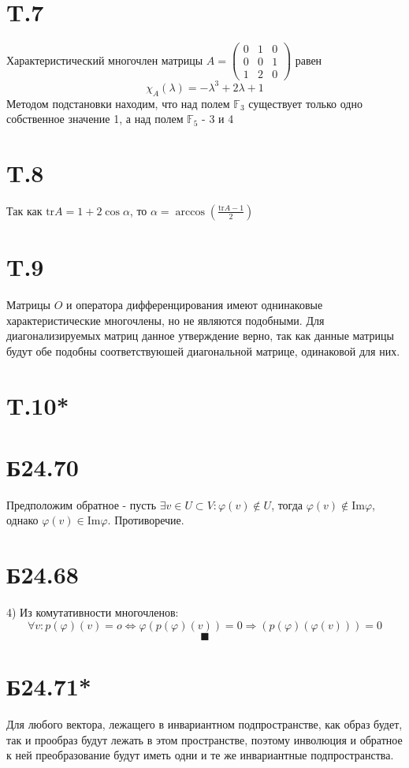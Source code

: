 \documentclass[a4paper,12pt]{article} %
\begin{document}
\section*{T.7}Характеристический многочлен матрицы $A=\begin{pmatrix*}
    0&1&0\\
    0&0&1\\
    1&2&0
\end{pmatrix*}$ равен
$$\chi_{A}(\lambda)=-\lambda^3+2\lambda+1$$
Методом подстановки находим, что над полем $\mathbb{F}_{3}$ существует только одно собственное значение 1, а над полем $\mathbb{F}_{5}$ - 3 и 4
\section*{T.8} Так как $\mathrm{tr}A=1+2\cos\alpha$, то $\alpha=\arccos\left(\frac{\mathrm{tr}A-1}{2}\right)$
\section*{T.9} Матрицы $O$ и оператора дифференцирования имеют однинаковые характеристические многочлены, но не являются подобными. Для диагонализируемых матриц данное утверждение верно, так как данные матрицы будут обе подобны соответствуюшей диагональной матрице, одинаковой для них.
\section*{T.10*}
\section*{Б24.70}Предположим обратное - пусть $\exists v\in U\subset V:\varphi(v)\not\in U$, тогда $\varphi(v)\not\in \mathrm{Im}\varphi$, однако $\varphi(v)\in\mathrm{Im}\varphi$. Противоречие. 
\section*{Б24.68}4) Из комутативности многочленов:
$$\forall v:p(\varphi)(v)=o\Leftrightarrow\varphi(p(\varphi)(v))=0\Rightarrow(p(\varphi)(\varphi (v)))=0$$
$$\blacksquare$$
\section*{Б24.71*}Для любого вектора, лежащего в инвариантном подпространстве, как образ будет, так и прообраз будут лежать в этом пространстве, поэтому инволюция и обратное к ней преобразование будут иметь одни и те же инвариантные подпространства.
\end{document}
